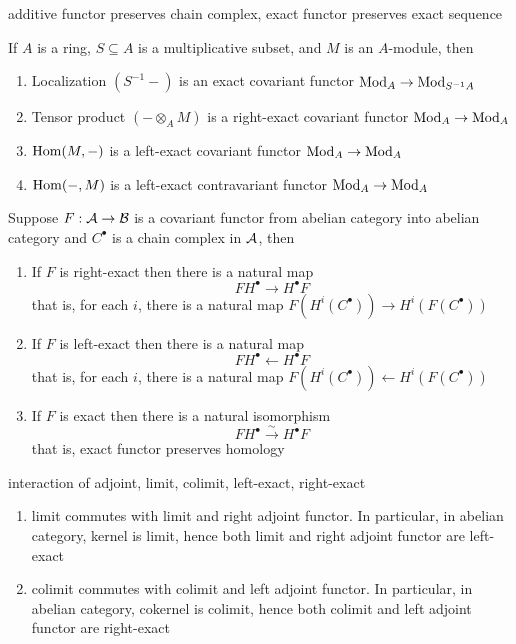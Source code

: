 \begin{proposition}
	additive functor preserves chain complex, exact functor preserves exact sequence
\end{proposition}

\begin{remark}
	If $A$ is a ring, $S \subseteq A$ is a multiplicative subset, and $M$ is an $A$-module, then
	\begin{enumerate}
		\item Localization $(S^{-1} -)$ is an exact covariant functor $\operatorname{Mod}_A \to \operatorname{Mod}_{S^{-1} A}$
		\item Tensor product $(- \otimes_A M)$ is a right-exact covariant functor $\operatorname{Mod}_A \to \operatorname{Mod}_A$
		\item $\operatorname{Hom}(M, -)$ is a left-exact covariant functor $\operatorname{Mod}_A \to \operatorname{Mod}_A$
		\item $\operatorname{Hom}(-, M)$ is a left-exact contravariant functor $\operatorname{Mod}_A \to \operatorname{Mod}_A$
	\end{enumerate}
\end{remark}

\begin{theorem}
	Suppose $F: \mathcal{A} \to \mathcal{B}$ is a covariant functor from abelian category into abelian category and $C^\bullet$ is a chain complex in $\mathcal{A}$, then
	\begin{enumerate}
		\item If $F$ is right-exact then there is a natural map
		$$
			F H^\bullet \rightarrow H^\bullet F
		$$
		that is, for each $i$, there is a natural map $F(H^i(C^\bullet)) \to H^i(F(C^\bullet))$
		
		\item If $F$ is left-exact then there is a natural map
		$$
			F H^\bullet \leftarrow H^\bullet F
		$$
		that is, for each $i$, there is a natural map $F(H^i(C^\bullet)) \leftarrow H^i(F(C^\bullet))$
		
		\item If $F$ is exact then there is a natural isomorphism
		$$
			F H^\bullet \xrightarrow{\sim} H^\bullet F
		$$
		that is, exact functor preserves homology
	\end{enumerate}
\end{theorem}

\begin{remark}
	interaction of adjoint, limit, colimit, left-exact, right-exact
	\begin{enumerate}
		\item limit commutes with limit and right adjoint functor. In particular, in abelian category, kernel is limit, hence both limit and right adjoint functor are left-exact
		\item colimit commutes with colimit and left adjoint functor. In particular, in abelian category, cokernel is colimit, hence both colimit and left adjoint functor are right-exact
	\end{enumerate}
\end{remark}

